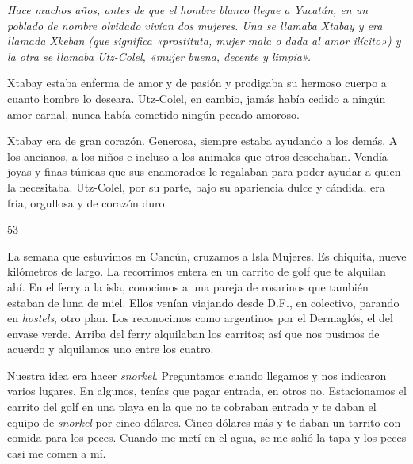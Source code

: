 \documentclass[12pt,twoside,openright,a5paper]{book}
\begin{document}
\nopagebreak

\vspace{0.5cm}

\nopagebreak

{\em Hace muchos años, antes de que el hombre blanco llegue a Yucatán,
en un poblado de nombre olvidado vivían dos mujeres. Una se llamaba Xtabay
y era llamada Xkeban (que significa «prostituta, mujer mala o dada al amor
ilícito») y la otra se llamaba Utz-Colel, «mujer buena, decente y limpia».

Xtabay estaba enferma de amor y de pasión y prodigaba su hermoso cuerpo
a cuanto hombre lo deseara. Utz-Colel, en cambio, jamás había cedido a
ningún amor carnal, nunca había cometido ningún pecado amoroso.

Xtabay era de gran corazón. Generosa, siempre estaba ayudando a los
demás. A los ancianos, a los niños e incluso a los animales que otros
desechaban. Vendía joyas y finas túnicas que sus enamorados le regalaban
para poder ayudar a quien la necesitaba. Utz-Colel, por su parte, bajo su
apariencia dulce y cándida, era fría, orgullosa y de corazón duro.}

\vspace{0.5cm}
\afterpage{}
\hrulefill \hspace{0.1cm}\decofourleft\hspace{0.2cm} 53 \hspace{0.2cm}\decofourright \hspace{0.1cm}\hrulefill

\nopagebreak

\vspace{0.5cm}

\nopagebreak

La semana que estuvimos en Cancún, cruzamos a Isla Mujeres. Es chiquita,
nueve kilómetros de
largo. La recorrimos entera en un carrito de golf que te alquilan ahí. En
el ferry a la isla, conocimos a una pareja de rosarinos que también estaban
de luna de miel. Ellos venían viajando desde D.F., en colectivo, parando
en \emph{hostels}, otro plan. Los reconocimos como argentinos por el Dermaglós,
el del envase verde. Arriba del ferry alquilaban los carritos; así que nos
pusimos de acuerdo y alquilamos uno entre los cuatro.

Nuestra idea era hacer \emph{snorkel}. Preguntamos cuando llegamos y nos
indicaron varios lugares. En algunos, tenías que pagar entrada, en otros
no. Estacionamos el carrito del golf en una playa en la que no te cobraban
entrada y te daban el equipo de \emph{snorkel} por cinco dólares. Cinco dólares más y
te daban un tarrito con comida para los peces. Cuando me metí en el agua,
se me salió la tapa y los peces casi me comen a mí.
\end{document}
